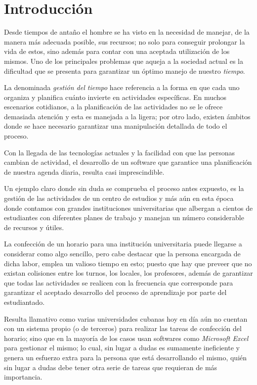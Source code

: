 \chapter{Introducción}

Desde tiempos de antaño el hombre se ha visto en la necesidad de manejar, de la manera más adecuada posible, sus recursos; no solo para conseguir prolongar la vida de estos, sino además para contar con una aceptada utilización de los mismos. Uno de los principales problemas que aqueja a la sociedad actual es la dificultad que se presenta para garantizar un óptimo manejo de nuestro \textit{tiempo}.\cite{bbc_time_management}
	
La denominada \textit{gestión del tiempo} hace referencia a la forma en que cada uno organiza y planifica cuánto invierte en actividades específicas. En muchos escenarios cotidianos, a la planificación de las actividades no se le ofrece demasiada atención y esta es manejada a la ligera; por otro lado, existen ámbitos donde se hace necesario garantizar una manipulación detallada de todo el proceso.
	
Con la llegada de las tecnologías actuales y la facilidad con que las personas cambian de actividad, el desarrollo de un software que garantice una planificación de nuestra agenda diaria, resulta casi imprescindible.
	
Un ejemplo claro donde sin duda se comprueba el proceso antes expuesto, es la gestión de las actividades de un centro de estudios y más aún en esta época donde contamos con grandes instituciones universitarias que albergan a cientos de estudiantes con diferentes planes de trabajo y manejan un número considerable de recursos y útiles.
	
La confección de un horario para una institución universitaria puede llegarse a considerar como algo sencillo, pero cabe destacar que la persona encargada de dicha labor, emplea un valioso tiempo en esto; puesto que hay que preveer que no existan colisiones entre los turnos, los locales, los profesores, además de garantizar que todas las actividades se realicen con la frecuencia que corresponde para garantizar el aceptado desarrollo del proceso de aprendizaje por parte del estudiantado.
	
Resulta llamativo como varias universidades cubanas hoy en día aún no cuentan con un sistema propio (o de terceros) para realizar las tareas de confección del horario; sino que en la mayoría de los casos usan softwares como \textit{Microsoft Excel} para gestionar el mismo; lo cual, sin lugar a dudas es sumamente ineficiente y genera un esfuerzo extra para la persona que está desarrollando el mismo, quién sin lugar a dudas debe tener otra serie de tareas que requieran de más importancia.
	
